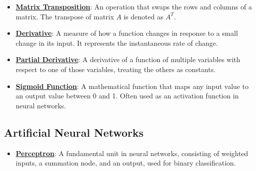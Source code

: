 \documentclass{article}%
\begin{document}
\begin{itemize}[leftmargin=*]
\item \href{https://purdue.brightspace.com/d2l/common/assets/pdfjs-d2l-dist/1.0.14-legacy/web/viewer.html?file=\%2Fcontent\%2Fenforced\%2F1095467-wl.202510.CS.24300.001\%2F04L1-Linear Algebra Primer.pdf\%3Fou\%3D1095467\&lang=en-us\&container=d2l-fileviewer-rendered-pdf\&fullscreen=d2l-fileviewer-rendered-pdf-dialog\&height=667#page=16}{\textbf{Matrix Transposition}}: An operation that swaps the rows and columns of a matrix. The transpose of matrix $A$ is denoted as $A^T$.%
\item \href{https://purdue.brightspace.com/d2l/common/assets/pdfjs-d2l-dist/1.0.14-legacy/web/viewer.html?file=\%2Fcontent\%2Fenforced\%2F1095467-wl.202510.CS.24300.001\%2F04L1-Linear Algebra Primer.pdf\%3Fou\%3D1095467\&lang=en-us\&container=d2l-fileviewer-rendered-pdf\&fullscreen=d2l-fileviewer-rendered-pdf-dialog\&height=667#page=21}{\textbf{Derivative}}: A measure of how a function changes in response to a small change in its input. It represents the instantaneous rate of change.%
\item \href{https://purdue.brightspace.com/d2l/common/assets/pdfjs-d2l-dist/1.0.14-legacy/web/viewer.html?file=\%2Fcontent\%2Fenforced\%2F1095467-wl.202510.CS.24300.001\%2F04L1-Linear Algebra Primer.pdf\%3Fou\%3D1095467\&lang=en-us\&container=d2l-fileviewer-rendered-pdf\&fullscreen=d2l-fileviewer-rendered-pdf-dialog\&height=667#page=19}{\textbf{Partial Derivative}}: A derivative of a function of multiple variables with respect to one of those variables, treating the others as constants.%
\item \href{https://purdue.brightspace.com/d2l/common/assets/pdfjs-d2l-dist/1.0.14-legacy/web/viewer.html?file=\%2Fcontent\%2Fenforced\%2F1095467-wl.202510.CS.24300.001\%2F04L1-Linear Algebra Primer.pdf\%3Fou\%3D1095467\&lang=en-us\&container=d2l-fileviewer-rendered-pdf\&fullscreen=d2l-fileviewer-rendered-pdf-dialog\&height=667#page=21}{\textbf{Sigmoid Function}}: A mathematical function that maps any input value to an output value between 0 and 1. Often used as an activation function in neural networks.%
\end{itemize}

%
\subsection{Artificial Neural Networks}%
\label{subsec:ArtificialNeuralNetworks}%
\begin{itemize}[leftmargin=*]%
\item \href{https://purdue.brightspace.com/d2l/common/assets/pdfjs-d2l-dist/1.0.14-legacy/web/viewer.html?file=\%2Fcontent\%2Fenforced\%2F1095467-wl.202510.CS.24300.001\%2F02L2-Intro.pdf\%3Fou\%3D1095467\&lang=en-us\&container=d2l-fileviewer-rendered-pdf\&fullscreen=d2l-fileviewer-rendered-pdf-dialog\&height=667#page=45}{\textbf{Perceptron}}: A fundamental unit in neural networks, consisting of weighted inputs, a summation node, and an output, used for binary classification.%
\end{itemize}
\end{document}
